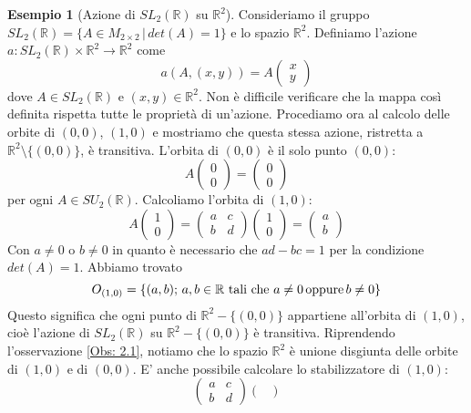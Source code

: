 \documentclass[12pt,a4paper]{report}
\theoremstyle{definition}
\theoremstyle{Theorem}
\theoremstyle{definition}
\newtheorem{Ex}[Def]{Esempio}
\theoremstyle{definition}
\theoremstyle{definition}
\begin{document}
\begin{Ex} [Azione di $SL_2(\mathbb{R})$ su $\mathbb{R}^2$]
	Consideriamo il gruppo $SL_2(\mathbb{R})=\{A\in M_{2\times 2}\,|\,det(A)=1\}$ e lo spazio $\mathbb{R}^2$. Definiamo l'azione $a:SL_2(\mathbb{R})\times \mathbb{R}^2\rightarrow\mathbb{R}^2$ come 
	$$a(A,(x,y))=A\begin{pmatrix}
		x\\y
	\end{pmatrix}$$
dove $A\in SL_2(\mathbb{R})$ e $(x,y)\in\mathbb{R}^2$. Non è difficile verificare che la mappa così definita rispetta tutte le proprietà di un'azione. Procediamo ora al calcolo delle orbite di $(0,0)$, $(1,0)$ e mostriamo che questa stessa azione, ristretta a $\mathbb{R}^2\setminus\{(0,0)\}$, è transitiva.
L'orbita di $(0,0)$ è il solo punto $(0,0)$:
$$A\begin{pmatrix}
	0\\0
\end{pmatrix}=\begin{pmatrix}
0\\0
\end{pmatrix}$$
per ogni $A\in SU_2(\mathbb{R})$. Calcoliamo l'orbita di $(1,0)$:
$$A\begin{pmatrix}
	1\\0
\end{pmatrix}=\begin{pmatrix}
a&c\\
b&d
\end{pmatrix}\begin{pmatrix}
1\\0
\end{pmatrix}=\begin{pmatrix}
a\\b
\end{pmatrix}$$
Con $a\neq 0$ o $b\neq 0$ in quanto è necessario che $ad-bc=1$ per la condizione $det(A)=1$. Abbiamo trovato $$O_{(1,0)}=\{(a,b);\, a,b\in\mathbb{R}\,\, \hbox{tali che} \, \, a \neq 0 \, \hbox{oppure} \, b\neq 0 \}$$ 
Questo significa che ogni punto di $\mathbb{R}^2-\{(0,0)\}$ appartiene all'orbita di $(1,0)$, cioè l'azione di $SL_2(\mathbb{R})$ su $\mathbb{R}^2-\{(0,0)\}$ è transitiva.
Riprendendo l'osservazione \ref{Obs: 2.1}, notiamo che lo spazio $\mathbb{R}^2$ è unione disgiunta delle orbite di $(1,0)$ e di $(0,0)$.
E' anche possibile calcolare lo stabilizzatore di $(1,0)$:
$$\begin{pmatrix}
	a&c\\
	b&d
\end{pmatrix}\begin{pmatrix}

\end{pmatrix}$$
\end{Ex}
\end{document}
